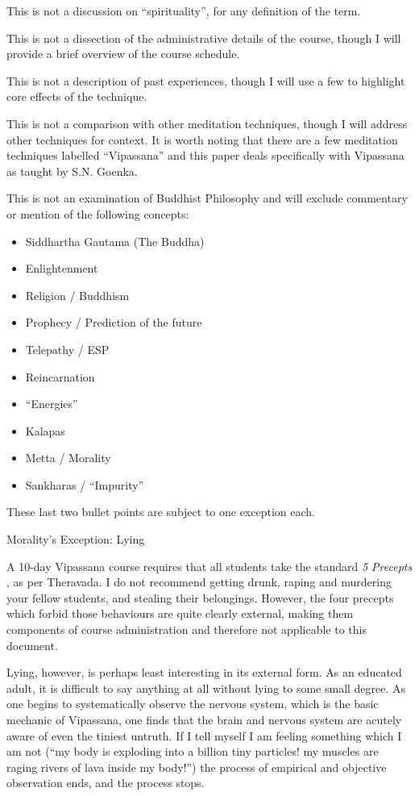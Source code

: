 \documentclass{article}
\begin{document}
This is not a discussion on ``spirituality'', for any definition of the term.

This is not a dissection of the administrative details of the course, though I will provide a brief overview of the course schedule.

This is not a description of past experiences, though I will use a few to highlight core effects of the technique.

This is not a comparison with other meditation techniques, though I will address other techniques for context. It is worth noting that there are a few meditation techniques labelled ``Vipassana'' and this paper deals specifically with Vipassana as taught by S.N. Goenka.

This is not an examination of Buddhist Philosophy and will exclude commentary or mention of the following concepts:

\begin{itemize}
  \item Siddhartha Gautama (The Buddha)
  \item Enlightenment
  \item Religion / Buddhism
  \item Prophecy / Prediction of the future
  \item Telepathy / ESP
  \item Reincarnation
  \item ``Energies''
  \item Kalapas
  \item Metta / Morality
  \item Sankharas / ``Impurity''
\end{itemize}

These last two bullet points are subject to one exception each.

\pagebreak

\begin{center}
  \LARGE{Morality's Exception: Lying}
\end{center}

A 10-day Vipassana course requires that all students take the standard \textit{5 Precepts} \cite{fiveprecepts}, as per Theravada. I do not recommend getting drunk, raping and murdering your fellow students, and stealing their belongings. However, the four precepts which forbid those behaviours are quite clearly external, making them components of course administration and therefore not applicable to this document.

Lying, however, is perhaps least interesting in its external form. As an educated adult, it is difficult to say anything at all without lying to some small degree. As one begins to systematically observe the nervous system, which is the basic mechanic of Vipassana, one finds that the brain and nervous system are acutely aware of even the tiniest untruth. If I tell myself I am feeling something which I am not (``my body is exploding into a billion tiny particles! my muscles are raging rivers of lava inside my body!'') the process of empirical and objective observation ends, and the process stops.
\end{document}
